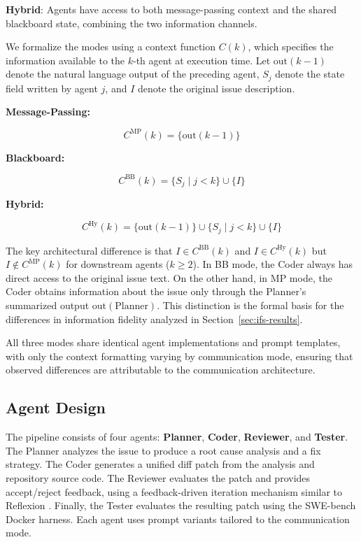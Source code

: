 \documentclass{ieeeaccess}
\begin{document}
\textbf{Hybrid}: Agents have access to both message-passing context and the shared blackboard state, combining the two information channels.

We formalize the modes using a context function $C(k)$, which specifies the information available to the $k$-th agent at execution time. Let $\text{out}(k{-}1)$ denote the natural language output of the preceding agent, $S_j$ denote the state field written by agent $j$, and $I$ denote the original issue description.

\textbf{Message-Passing:}

\[C^{\text{MP}}(k) = \{\text{out}(k{-}1)\}\]

\textbf{Blackboard:}

\[C^{\text{BB}}(k) = \{S_j \mid j < k\} \cup \{I\}\]

\textbf{Hybrid:}

\[C^{\text{Hy}}(k) = \{\text{out}(k{-}1)\} \cup \{S_j \mid j < k\} \cup \{I\}\]

The key architectural difference is that $I \in C^{\text{BB}}(k)$ and $I \in C^{\text{Hy}}(k)$ but $I \notin C^{\text{MP}}(k)$ for downstream agents ($k \geq 2$). In BB mode, the Coder always has direct access to the original issue text. On the other hand, in MP mode, the Coder obtains information about the issue only through the Planner's summarized output $\text{out}(\text{Planner})$. This distinction is the formal basis for the differences in information fidelity analyzed in Section~\ref{sec:ifs-results}.

All three modes share identical agent implementations and prompt templates, with only the context formatting varying by communication mode, ensuring that observed differences are attributable to the communication architecture.

\subsection{Agent Design}

The pipeline consists of four agents: \textbf{Planner}, \textbf{Coder}, \textbf{Reviewer}, and \textbf{Tester}. The Planner analyzes the issue to produce a root cause analysis and a fix strategy. The Coder generates a unified diff patch from the analysis and repository source code. The Reviewer evaluates the patch and provides accept/reject feedback, using a feedback-driven iteration mechanism similar to Reflexion \cite{shinn2023reflexion}. Finally, the Tester evaluates the resulting patch using the SWE-bench Docker harness. Each agent uses prompt variants tailored to the communication mode.
\end{document}
